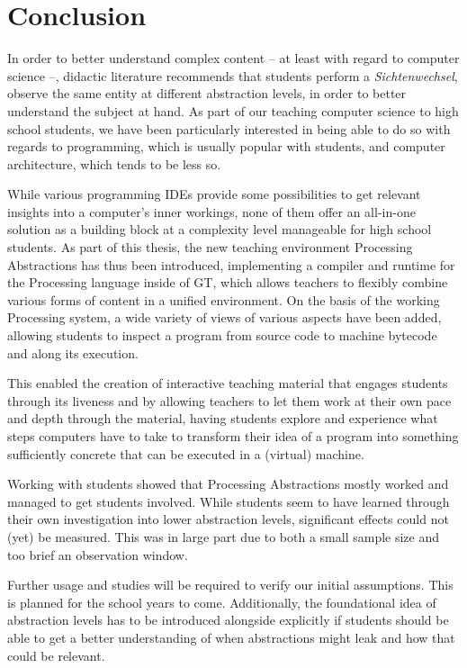
\chapter{Conclusion} \label{ch_conclusion}

In order to better understand complex content -- at least with regard to computer science --, didactic literature recommends that students perform a \emph{Sichtenwechsel}, \ie observe the same entity at different abstraction levels, in order to better understand the subject at hand. As part of our teaching computer science to high school students, we have been particularly interested in being able to do so with regards to programming, which is usually popular with students, and computer architecture, which tends to be less so.

While various programming \acp{IDE} provide some possibilities to get relevant insights into a computer's inner workings, none of them offer an all-in-one solution as a building block at a complexity level manageable for high school students. As part of this thesis, the new teaching environment Processing Abstractions has thus been introduced, implementing a compiler and runtime for the Processing language inside of \acf{GT}, which allows teachers to flexibly combine various forms of content in a unified environment. On the basis of the working Processing system, a wide variety of views of various aspects have been added, allowing students to inspect a program from source code to machine bytecode and along its execution.

This enabled the creation of interactive teaching material that engages students through its liveness and by allowing teachers to let them work at their own pace and depth through the material, having students explore and experience what steps computers have to take to transform their idea of a program into something sufficiently concrete that can be executed in a (virtual) machine.

Working with students showed that Processing Abstractions mostly worked and managed to get students involved. While students seem to have learned through their own investigation into lower abstraction levels, significant effects could not (yet) be measured. This was in large part due to both a small sample size and too brief an observation window.

Further usage and studies will be required to verify our initial assumptions. This is planned for the school years to come. Additionally, the foundational idea of abstraction levels has to be introduced alongside explicitly if students should be able to get a better understanding of when abstractions might leak and how that could be relevant.



